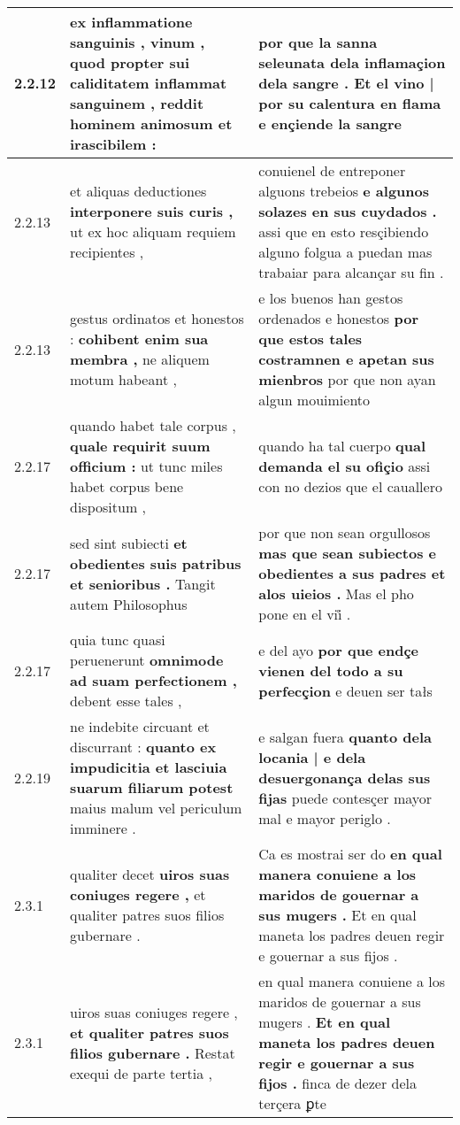 \begin{tabular}{|p{1cm}|p{6.5cm}|p{6.5cm}|}
2.2.12 & ex inflammatione sanguinis , \textbf{ vinum , quod propter sui caliditatem inflammat sanguinem , } reddit hominem animosum et irascibilem : & por que la sanna seleunata dela inflamaçion dela sangre . \textbf{ Et el vino | por su calentura en flama } e ençiende la sangre \\\hline
2.2.13 & et aliquas deductiones \textbf{ interponere suis curis , } ut ex hoc aliquam requiem recipientes , & conuienel de entreponer alguons trebeios \textbf{ e algunos solazes en sus cuydados . } assi que en esto resçibiendo alguno folgua a puedan mas trabaiar para alcançar su fin . \\\hline
2.2.13 & gestus ordinatos et honestos : \textbf{ cohibent enim sua membra , } ne aliquem motum habeant , & e los buenos han gestos ordenados e honestos \textbf{ por que estos tales costramnen e apetan sus mienbros } por que non ayan algun mouimiento \\\hline
2.2.17 & quando habet tale corpus , \textbf{ quale requirit suum officium : } ut tunc miles habet corpus bene dispositum , & quando ha tal cuerpo \textbf{ qual demanda el su ofiçio } assi con no dezios que el cauallero \\\hline
2.2.17 & sed sint subiecti \textbf{ et obedientes suis patribus et senioribus . } Tangit autem Philosophus & por que non sean orgullosos \textbf{ mas que sean subiectos e obedientes a sus padres et alos uieios . } Mas el pho pone en el vii̊ . \\\hline
2.2.17 & quia tunc quasi peruenerunt \textbf{ omnimode ad suam perfectionem , } debent esse tales , & e del ayo \textbf{ por que endçe vienen del todo a su perfecçion } e deuen ser tałs \\\hline
2.2.19 & ne indebite circuant et discurrant : \textbf{ quanto ex impudicitia et lasciuia suarum filiarum potest } maius malum vel periculum imminere . & e salgan fuera \textbf{ quanto dela locania | e dela desuergonança delas sus fijas } puede contesçer mayor mal e mayor periglo . \\\hline
2.3.1 & qualiter decet \textbf{ uiros suas coniuges regere , } et qualiter patres suos filios gubernare . & Ca es mostrai ser do \textbf{ en qual manera conuiene a los maridos de gouernar a sus mugers . } Et en qual maneta los padres deuen regir e gouernar a sus fijos . \\\hline
2.3.1 & uiros suas coniuges regere , \textbf{ et qualiter patres suos filios gubernare . } Restat exequi de parte tertia , & en qual manera conuiene a los maridos de gouernar a sus mugers . \textbf{ Et en qual maneta los padres deuen regir e gouernar a sus fijos . } finca de dezer dela terçera ꝑte \\\hline

\end{tabular}
